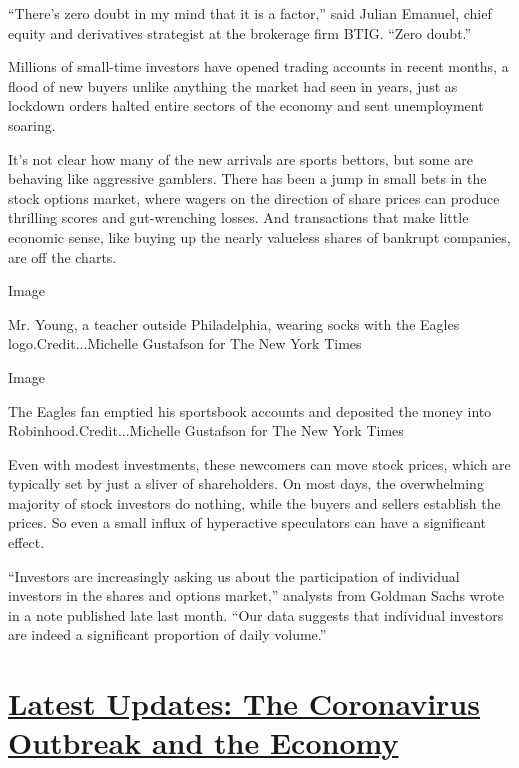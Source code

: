 ``There's zero doubt in my mind that it is a factor,'' said Julian
Emanuel, chief equity and derivatives strategist at the brokerage firm
BTIG. ``Zero doubt.''

Millions of small-time investors have opened trading accounts in recent
months, a flood of new buyers unlike anything the market had seen in
years, just as lockdown orders halted entire sectors of the economy and
sent unemployment soaring.

It's not clear how many of the new arrivals are sports bettors, but some
are behaving like aggressive gamblers. There has been a jump in small
bets in the stock options market, where wagers on the direction of share
prices can produce thrilling scores and gut-wrenching losses. And
transactions that make little economic sense, like buying up the nearly
valueless shares of bankrupt companies, are off the charts.

Image

Mr. Young, a teacher outside Philadelphia, wearing socks with the Eagles
logo.Credit...Michelle Gustafson for The New York Times

Image

The Eagles fan emptied his sportsbook accounts and deposited the money
into Robinhood.Credit...Michelle Gustafson for The New York Times

Even with modest investments, these newcomers can move stock prices,
which are typically set by just a sliver of shareholders. On most days,
the overwhelming majority of stock investors do nothing, while the
buyers and sellers establish the prices. So even a small influx of
hyperactive speculators can have a significant effect.

``Investors are increasingly asking us about the participation of
individual investors in the shares and options market,'' analysts from
Goldman Sachs wrote in a note published late last month. ``Our data
suggests that individual investors are indeed a significant proportion
of daily volume.''

\hypertarget{latest-updates-the-coronavirus-outbreak-and-the-economy}{%
\section{\texorpdfstring{\href{https://www.nytimes3xbfgragh.onion/live/2020/09/11/business/stock-market-today-coronavirus?action=click\&pgtype=Article\&state=default\&region=MAIN_CONTENT_1\&context=storylines_live_updates}{Latest
Updates: The Coronavirus Outbreak and the
Economy}}{Latest Updates: The Coronavirus Outbreak and the Economy}}\label{latest-updates-the-coronavirus-outbreak-and-the-economy}}

